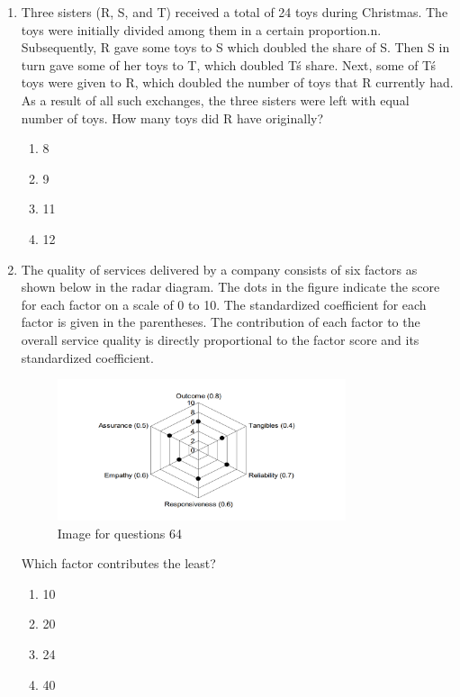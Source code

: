 \documentclass[journal,12pt,onecolumn]{IEEEtran}
\theoremstyle{remark}
\begin{document}
\begin{enumerate}[resume]
\item Three sisters (R, S, and T) received a total of 24 toys during Christmas. The toys were initially divided among them in a certain proportion.n. Subsequently, R gave some toys to S which doubled the share of S. Then S in turn gave some of her toys to T, which doubled T\'s share. Next, some of T\'s toys were given to R, which doubled the number of toys that R currently had. As a result of all such exchanges, the three sisters were left with equal number of toys. How many toys did R have
originally? 
\begin{multicols}{4}
\begin{enumerate}
\item 8  
\item 9  
\item 11  
\item 12  
\end{enumerate}
\end{multicols}

\item The quality of services delivered by a company consists of six factors as shown below in the radar diagram. The dots in the figure indicate the score for each factor on a scale of 0 to 10. The standardized coefficient for each factor is given in the parentheses. The contribution of each factor to the overall service quality is directly proportional to the factor score and its standardized coefficient.  

\begin{figure}[H]
    \centering
    \includegraphics[width=0.8\textwidth]{figs/fig12.png}
    \caption{Image for questions 64}
    \label{fig:question64}
\end{figure}
Which factor contributes the least?  
\begin{multicols}{4}
\begin{enumerate}
\item 10%
\item 20%
\item 24%
\item 40%
\end{enumerate}
\end{multicols}



\end{enumerate}
\end{document}
